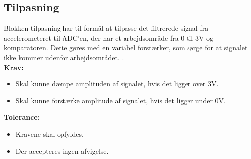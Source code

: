 \subsection{Tilpasning} 
Blokken tilpasning har til formål at tilpasse det filtrerede signal fra accelerometeret til ADC'en, der har et arbejdsområde fra 0 til 3V og komparatoren. Dette gøres med en variabel forstærker, som sørge for at signalet ikke kommer udenfor arbejdsområdet. . \\
\textbf{Krav:}
\begin{itemize}
\item Skal kunne dæmpe amplituden af signalet, hvis det ligger over 3V.
\item Skal kunne forstærke amplitude af signalet, hvis det ligger under 0V.
\end{itemize}
\textbf{Tolerance:}
\begin{itemize}
\item Kravene skal opfyldes.
\item Der accepteres ingen afvigelse.
\end{itemize}
